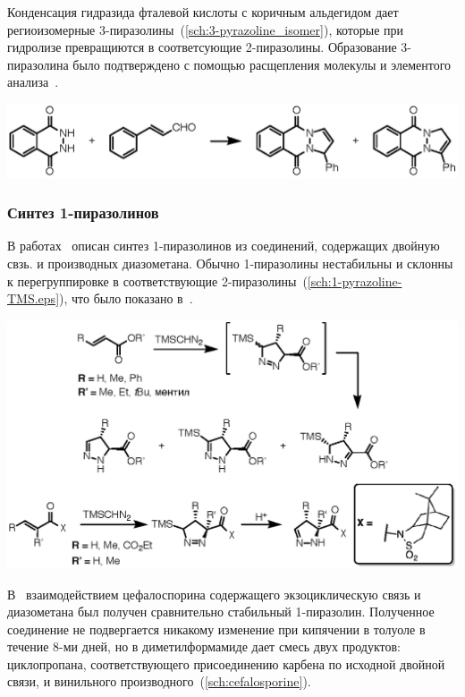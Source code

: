 Конденсация гидразида фталевой кислоты с коричным альдегидом дает региоизомерные 3-пиразолины~(\ref{sch:3-pyrazoline_isomer}), которые при гидролизе превращиются в соответсующие 2-пиразолины.
Образование 3-пиразолина было подтверждено с помощью расщепления молекулы и элементого анализа~\cite{Chemistry1967}.

\begin{scheme}
    \centering
    \includegraphics{sections/literature/img/3-pyrazoline_isomer.eps}
    \caption{}
    \label{sch:3-pyrazoline_isomer}
\end{scheme}

\subsubsection{Синтез 1-пиразолинов}
В работах~\cite{Baldwin1990, Mish1997, Simovic2007, Sun2013} описан синтез 1-пиразолинов из соединений, содержащих двойную свзь. и производных диазометана. 
Обычно 1-пиразолины нестабильны и склонны к перегруппировке в соответствующие 2-пиразолины~(\ref{sch:1-pyrazoline-TMS.eps}), что было показано в~\cite{Mish1997, Simovic2007}.

\begin{scheme}
    \centering
    \includegraphics{sections/literature/img/1-pyrazoline-TMS.eps}
    \caption{}
    \label{sch:1-pyrazoline-TMS.eps}
\end{scheme}

В~\cite{Baldwin1990} взаимодействием цефалоспорина содержащего экзоциклическую связь и диазометана был получен сравнительно стабильный 1-пиразолин.
Полученное соединение не подвергается никакому изменение при кипячении в толуоле в течение 8-ми дней, но в диметилформамиде дает смесь двух продуктов: циклопропана, соответствующего присоединению карбена по исходной двойной связи, и винильного производного~(\ref{sch:cefalosporine}). 


